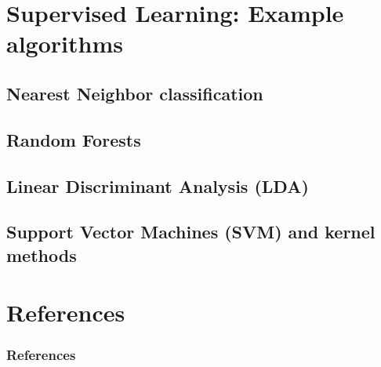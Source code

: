 \documentclass[xcolor=pdftex,dvipsnames,table]{beamer}
\begin{document}
\section{Supervised Learning: Example algorithms}
\subsection{Nearest Neighbor classification}
\subsection{Random Forests}
\subsection{Linear Discriminant Analysis (LDA)}
\subsection{Support Vector Machines (SVM) and kernel methods}

\section{References}
\begin{frame}[allowframebreaks]
	\frametitle{References}
	
\end{frame}
\end{document}
